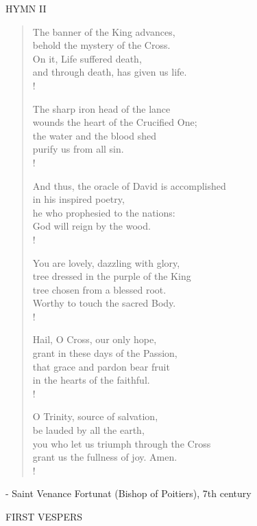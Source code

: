 \noindent\small{\uppercase{Hymn II }}\normalsize\label{holyweek:lastHymn}
\begin{verse}
The banner of the King advances,\\
behold the mystery of the Cross.\\
On it, Life suffered death,\\
and through death, has given us life.\\!

The sharp iron head of the lance\\
wounds the heart of the Crucified One;\\
the water and the blood shed\\
purify us from all sin.\\!

And thus, the oracle of David is accomplished\\
in his inspired poetry,\\
he who prophesied to the nations:\\
God will reign by the wood.\\!

You are lovely, dazzling with glory,\\
tree dressed in the purple of the King\\
tree chosen from a blessed root.\\
Worthy to touch the sacred Body.\\!

Hail, O Cross, our only hope,\\
grant in these days of the Passion,\\
that grace and pardon bear fruit\\
in the hearts of the faithful.\\!

O Trinity, source of salvation,\\
be lauded by all the earth,\\
you who let us triumph through the Cross\\
grant us the fullness of joy. Amen.\\!
\end{verse}
\begin{flushright}\tiny - Saint Venance Fortunat (Bishop of Poitiers), 7th century\end{flushright}

\begin{flushleft}\normalsize FIRST VESPERS\\\end{flushleft}

